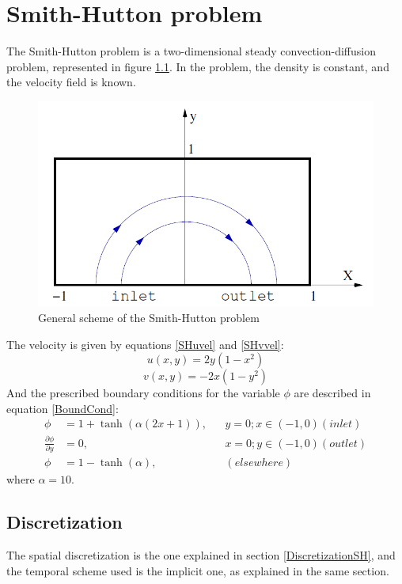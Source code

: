 \chapter{Smith-Hutton problem}
The Smith-Hutton problem is a two-dimensional steady convection-diffusion problem, represented in figure \ref{SHscheme}. In the problem, the density is constant, and the velocity field is known.
\begin{figure}[h!]
	\centering
	\includegraphics[scale=0.65]{SmithHutton/SmithHutton}
	\caption{General scheme of the Smith-Hutton problem}
	\label{SHscheme}
\end{figure}

The velocity is given by equations \ref{SHuvel} and \ref{SHvvel}:
\begin{equation}
u\left(x,y\right)=2y\left(1-x^{2}\right)
\label{SHuvel}
\end{equation}
\begin{equation}
v\left(x,y\right)=-2x\left(1-y^{2}\right)
\label{SHvvel}
\end{equation}
And the prescribed boundary conditions for the variable $\phi$ are described in equation \ref{BoundCond}:
\begin{equation}
\begin{aligned}
\phi &=1+\tanh\left(\alpha\left(2x+1\right)\right),&&y=0; x\in\left(-1,0\right) \left(inlet\right) \\
\frac{\partial\phi}{\partial y} &=0,&&x=0; y\in\left(-1,0\right) \left(outlet\right) \\
\phi &=1-\tanh\left(\alpha\right),&&\left(elsewhere\right)
\end{aligned}
\label{BoundCond}
\end{equation}
where $\alpha=10$.

\section{Discretization}
The spatial discretization is the one explained in section \ref{DiscretizationSH}, and the temporal scheme used is the implicit one, as explained in the same section.

